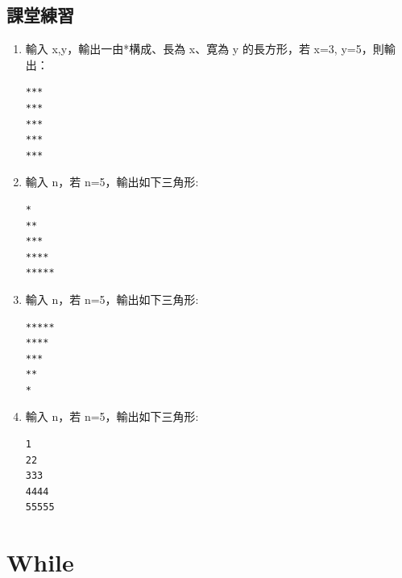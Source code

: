 \documentclass[a4paper,12pt]{article}
\begin{document}
\subsection{課堂練習}
\label{sec:org87ac3ac}
\begin{enumerate}
\item 輸入 x,y，輸出一由*構成、長為 x、寛為 y 的長方形，若 x=3, y=5，則輸出：
\label{sec:org218cc5b}
\begin{verbatim}
***
***
***
***
***
\end{verbatim}
\item 輸入 n，若 n=5，輸出如下三角形:
\label{sec:orge262438}
\begin{verbatim}
*
**
***
****
*****
\end{verbatim}
\item 輸入 n，若 n=5，輸出如下三角形:
\label{sec:org73e834f}
\begin{verbatim}
*****
****
***
**
*
\end{verbatim}
\item 輸入 n，若 n=5，輸出如下三角形:
\label{sec:org78564ce}
\begin{verbatim}
1
22
333
4444
55555
\end{verbatim}
\end{enumerate}

\section{While}
\label{cpp_while}
\end{document}
